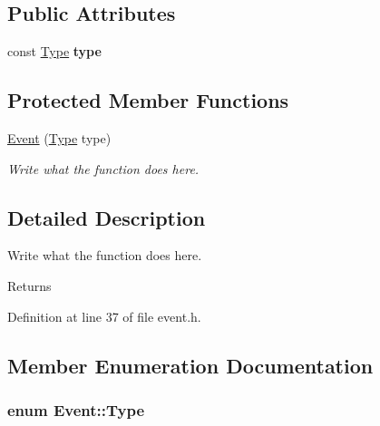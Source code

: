 \subsection*{Public Attributes}
\begin{DoxyCompactItemize}
\item 
\hypertarget{classEvent_a86404000a5e0b6b3afdb2c88d4923e3b}{const \hyperlink{classEvent_a2abf13b5be49315e9e362af02029f058}{Type} {\bfseries type}}\label{classEvent_a86404000a5e0b6b3afdb2c88d4923e3b}

\end{DoxyCompactItemize}
\subsection*{Protected Member Functions}
\begin{DoxyCompactItemize}
\item 
\hyperlink{classEvent_a07dd964621d0623bfccc24197c2f509b}{Event} (\hyperlink{classEvent_a2abf13b5be49315e9e362af02029f058}{Type} type)
\begin{DoxyCompactList}\small\item\em Write what the function does here. \end{DoxyCompactList}\end{DoxyCompactItemize}


\subsection{Detailed Description}
Write what the function does here. 

\begin{DoxyReturn}{Returns}

\end{DoxyReturn}


Definition at line 37 of file event.\+h.



\subsection{Member Enumeration Documentation}
\hypertarget{classEvent_a2abf13b5be49315e9e362af02029f058}{
\subsubsection[{Type}]{\setlength{\rightskip}{0pt plus 5cm}enum {\bf Event\+::\+Type}}}\label{classEvent_a2abf13b5be49315e9e362af02029f058}


